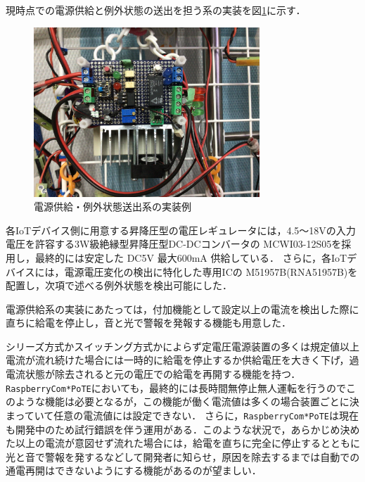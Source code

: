 現時点での電源供給と例外状態の送出を担う系の実装を図\ref{hohno:RaspberryComPoTE-Po1}に示す．\\
\begin{figure}[h]
\centering
\includegraphics[width=8.5cm]{figspics/RaspberryComPoTE_figY.png}
\caption{電源供給・例外状態送出系の実装例}
\label{hohno:RaspberryComPoTE-Po1}
\end{figure}

各IoTデバイス側に用意する昇降圧型の電圧レギュレータには，4.5〜18Vの入力電圧を許容する3W級絶縁型昇降圧型DC-DCコンバータの MCWI03-12S05\cite{data:MCWI03-12S05}を採用し，最終的には安定した DC5V 最大600mA 供給している．
さらに，各IoTデバイスには，電源電圧変化の検出に特化した専用ICの M51957B(RNA51957B)\cite{data:M51957B}を配置し，次項で述べる例外状態を検出可能にした．






電源供給系の実装にあたっては，付加機能として設定以上の電流を検出した際に直ちに給電を停止し，音と光で警報を発報する機能も用意した．

シリーズ方式かスイッチング方式かによらず定電圧電源装置の多くは規定値以上電流が流れ続けた場合には一時的に給電を停止するか供給電圧を大きく下げ，過電流状態が除去されると元の電圧での給電を再開する機能を持つ．
{\tt Raspberry\-Com*PoTE}においても，最終的には長時間無停止無人運転を行うのでこのような機能は必要となるが，この機能が働く電流値は多くの場合装置ごとに決まっていて任意の電流値には設定できない．
さらに，{\tt Raspberry\-Com*PoTE}は現在も開発中のため試行錯誤を伴う運用がある．このような状況で，あらかじめ決めた以上の電流が意図せず流れた場合には，給電を直ちに完全に停止するとともに
光と音で警報を発するなどして開発者に知らせ，原因を除去するまでは自動での通電再開はできないようにする機能があるのが望ましい．

